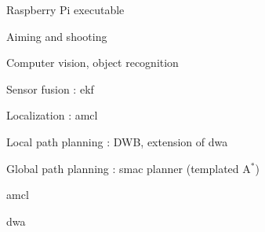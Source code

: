 
\begin{frame}{Raspberry Pi executable}

    Aiming and shooting

    Computer vision, object recognition

    Sensor fusion : \acf{ekf}

    Localization : \acf{amcl}
  
    Local path planning : DWB, extension of \acf{dwa}

    Global path planning : smac planner (templated A$^*$)
    
\end{frame}


\begin{frame}{\acf{amcl}}

    \begin{adjustbox}{scale=1,center,margin={0cm,0cm,0cm,0cm}}
        
    \end{adjustbox}
    
\end{frame}


\begin{frame}{\acf{dwa}}

    \begin{adjustbox}{scale=1.1,center,margin={0cm,0cm,0cm,0cm}}
        
    \end{adjustbox}
    
\end{frame}


